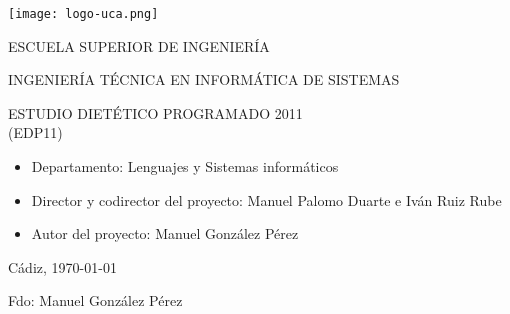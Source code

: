 


\begin{center}

  \texttt{[image: logo-uca.png]} \\

  \vspace{2.5cm}

  \Large{ESCUELA SUPERIOR DE INGENIERÍA} \\

  \vspace{1.0cm}

  \large{INGENIERÍA TÉCNICA EN INFORMÁTICA DE SISTEMAS} \\

  \vspace{2.0cm}

  \large{ESTUDIO DIETÉTICO PROGRAMADO 2011\\(EDP11)} \\

  \vspace{2.5cm}

\end{center}

\begin{itemize}
\item \large{Departamento: Lenguajes y Sistemas informáticos}
\item \large{Director y codirector del proyecto: Manuel Palomo Duarte e Iván Ruiz Rube}
\item \large{Autor del proyecto: Manuel González Pérez}
\end{itemize}

\vspace{0.2cm}

\begin{flushright}
  \large{Cádiz, \today} \\

  \vspace{2.5cm}

  \large{Fdo: Manuel González Pérez}
\end{flushright}
